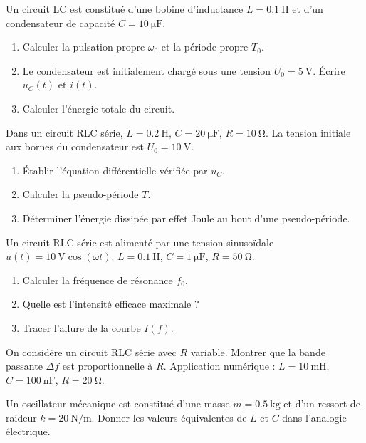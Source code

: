 
\exo{} Un circuit LC est constitué d’une bobine d’inductance $L = \SI{0.1}{\henry}$ et d’un condensateur de capacité $C = \SI{10}{\micro\farad}$.
\begin{enumerate}[label=\alph*)]
  \item Calculer la pulsation propre $\omega_0$ et la période propre $T_0$.
  \item Le condensateur est initialement chargé sous une tension $U_0 = \SI{5}{\volt}$. Écrire $u_C(t)$ et $i(t)$.
  \item Calculer l’énergie totale du circuit.
\end{enumerate}

\exo{} Dans un circuit RLC série, $L = \SI{0.2}{\henry}$, $C = \SI{20}{\micro\farad}$, $R = \SI{10}{\ohm}$. La tension initiale aux bornes du condensateur est $U_0 = \SI{10}{\volt}$.
\begin{enumerate}[label=\alph*)]
  \item Établir l’équation différentielle vérifiée par $u_C$.
  \item Calculer la pseudo-période $T$.
  \item Déterminer l’énergie dissipée par effet Joule au bout d’une pseudo-période.
\end{enumerate}


\exo{} Un circuit RLC série est alimenté par une tension sinusoïdale $u(t) = \SI{10}{\volt} \cos(\omega t)$. $L = \SI{0.1}{\henry}$, $C = \SI{1}{\micro\farad}$, $R = \SI{50}{\ohm}$.
\begin{enumerate}[label=\alph*)]
  \item Calculer la fréquence de résonance $f_0$.
  \item Quelle est l’intensité efficace maximale ?
  \item Tracer l’allure de la courbe $I(f)$.
\end{enumerate}

\exo{} On considère un circuit RLC série avec $R$ variable. Montrer que la bande passante $\Delta f$ est proportionnelle à $R$. Application numérique : $L = \SI{10}{\milli\henry}$, $C = \SI{100}{\nano\farad}$, $R = \SI{20}{\ohm}$.


\exo{} Un oscillateur mécanique est constitué d’une masse $m = \SI{0.5}{\kilogram}$ et d’un ressort de raideur $k = \SI{20}{\newton\per\metre}$. Donner les valeurs équivalentes de $L$ et $C$ dans l’analogie électrique.

